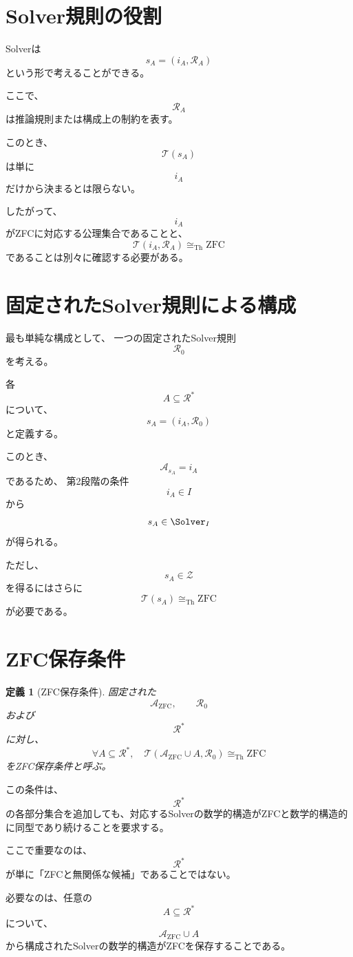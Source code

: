 \documentclass[11pt,a4paper]{article}
\newtheorem{definition}{定義}
\begin{document}
\section{Solver規則の役割}

Solverは
\[
s_A=(i_A,\mathcal{R}_A)
\]
という形で考えることができる。

ここで、
\[
\mathcal{R}_A
\]
は推論規則または構成上の制約を表す。

このとき、
\[
\mathcal{T}(s_A)
\]
は単に
\[
i_A
\]
だけから決まるとは限らない。

したがって、
\[
i_A
\]
がZFCに対応する公理集合であることと、
\[
\mathcal{T}(i_A,\mathcal{R}_A)
\cong_{\mathrm{Th}}\mathrm{ZFC}
\]
であることは別々に確認する必要がある。

\section{固定されたSolver規則による構成}

最も単純な構成として、
一つの固定されたSolver規則
\[
\mathcal{R}_0
\]
を考える。

各
\[
A\subseteq\mathcal{R}^*
\]
について、
\[
\boxed{
s_A=(i_A,\mathcal{R}_0)
}
\]
と定義する。

このとき、
\[
\mathcal{A}_{s_A}=i_A
\]
であるため、
第2段階の条件
\[
i_A\in I
\]
から
\[
s_A\in\Solver_I
\]
が得られる。

ただし、
\[
s_A\in\mathcal{Z}
\]
を得るにはさらに
\[
\mathcal{T}(s_A)\cong_{\mathrm{Th}}\mathrm{ZFC}
\]
が必要である。

\section{ZFC保存条件}

\begin{definition}[ZFC保存条件]
固定された
\[
\mathcal{A}_{\mathrm{ZFC}},
\qquad
\mathcal{R}_0
\]
および
\[
\mathcal{R}^*
\]
に対し、
\[
\boxed{
\forall A\subseteq\mathcal{R}^*,
\quad
\mathcal{T}(\mathcal{A}_{\mathrm{ZFC}}\cup A,\mathcal{R}_0)
\cong_{\mathrm{Th}}\mathrm{ZFC}
}
\]
をZFC保存条件と呼ぶ。
\end{definition}

この条件は、
\[
\mathcal{R}^*
\]
の各部分集合を追加しても、対応するSolverの数学的構造がZFCと数学的構造的に同型であり続けることを要求する。

ここで重要なのは、
\[
\mathcal{R}^*
\]
が単に「ZFCと無関係な候補」であることではない。

必要なのは、任意の
\[
A\subseteq\mathcal{R}^*
\]
について、
\[
\mathcal{A}_{\mathrm{ZFC}}\cup A
\]
から構成されたSolverの数学的構造がZFCを保存することである。
\end{document}
